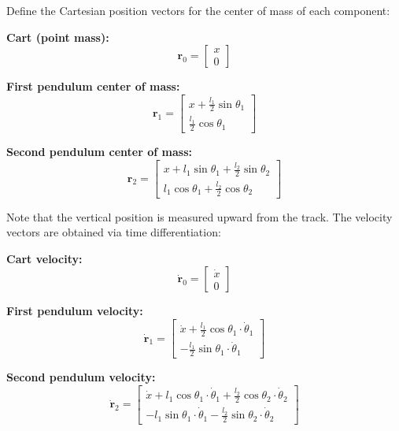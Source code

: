 Define the Cartesian position vectors for the center of mass of each component:

\textbf{Cart (point mass):}
\begin{equation}
\mathbf{r}_0 = \begin{bmatrix} x \\ 0 \end{bmatrix}
\label{eq:cart_position}
\end{equation}

\textbf{First pendulum center of mass:}
\begin{equation}
\mathbf{r}_1 = \begin{bmatrix} x + \frac{l_1}{2}\sin\theta_1 \\ \frac{l_1}{2}\cos\theta_1 \end{bmatrix}
\label{eq:pend1_position}
\end{equation}

\textbf{Second pendulum center of mass:}
\begin{equation}
\mathbf{r}_2 = \begin{bmatrix} x + l_1\sin\theta_1 + \frac{l_2}{2}\sin\theta_2 \\ l_1\cos\theta_1 + \frac{l_2}{2}\cos\theta_2 \end{bmatrix}
\label{eq:pend2_position}
\end{equation}

Note that the vertical position is measured upward from the track. The velocity vectors are obtained via time differentiation:

\textbf{Cart velocity:}
\begin{equation}
\dot{\mathbf{r}}_0 = \begin{bmatrix} \dot{x} \\ 0 \end{bmatrix}
\label{eq:cart_velocity}
\end{equation}

\textbf{First pendulum velocity:}
\begin{equation}
\dot{\mathbf{r}}_1 = \begin{bmatrix} \dot{x} + \frac{l_1}{2}\cos\theta_1 \cdot \dot{\theta}_1 \\ -\frac{l_1}{2}\sin\theta_1 \cdot \dot{\theta}_1 \end{bmatrix}
\label{eq:pend1_velocity}
\end{equation}

\textbf{Second pendulum velocity:}
\begin{equation}
\dot{\mathbf{r}}_2 = \begin{bmatrix} \dot{x} + l_1\cos\theta_1 \cdot \dot{\theta}_1 + \frac{l_2}{2}\cos\theta_2 \cdot \dot{\theta}_2 \\ -l_1\sin\theta_1 \cdot \dot{\theta}_1 - \frac{l_2}{2}\sin\theta_2 \cdot \dot{\theta}_2 \end{bmatrix}
\label{eq:pend2_velocity}
\end{equation}

